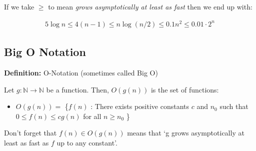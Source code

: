 \documentclass[11pt,a4paper,titlepage,dvipsnames,cmyk]{scrartcl}
\begin{document}
If we take $\ge$ to mean \textit{grows asymptotically at least as fast}
then we end up with:

\begin{align*}
    5 \log n \le 4(n-1) \le n \log (n/2) \le 0.1n^2 \le 0.01 \cdot 2^n
\end{align*}

\subsection{Big O Notation}%
\label{sub:big-o}

\begin{tcolorbox}
    \textbf{Definition:} O-Notation (sometimes called Big O)
    \medskip

    Let $g : \mathbb{N} \rightarrow \mathbb{N}$ be a function. Then,
    $O(g(n))$ is the set of functions:
    \medskip

    \begin{itemize}[label={},itemindent=-5em,leftmargin=5em]
        \item $O(g(n)) = $ \{$f(n)$ : There exists positive constants $c$
            and $n_0$ such that $0 \le f(n) \le cg(n)$ for all $n \ge n_0$
            \}
    \end{itemize}
\end{tcolorbox}

Don't forget that $f(n) \in O(g(n))$ means that `g grows asymptotically at
least as fast as $f$ up to any constant'.
\end{document}
